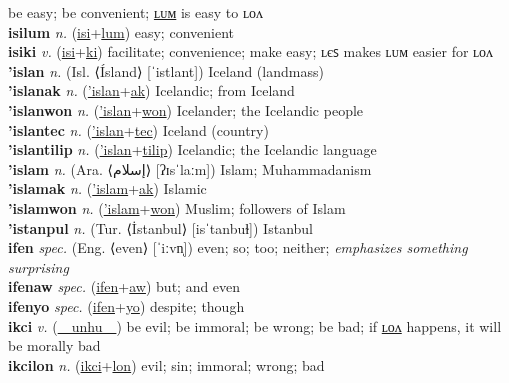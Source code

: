 be easy; be convenient; \hyperref[isilum]{ʟᴜᴍ} is easy to ʟᴏᴧ \label{isi} \\
\textbf{isilum} \textit{n.} (\hyperref[isi]{isi}+\hyperref[lum]{lum})
easy; convenient \label{isilum} \\
\textbf{isiki} \textit{v.} (\hyperref[isi]{isi}+\hyperref[ki]{ki})
facilitate; convenience; make easy; ʟєꜱ makes ʟᴜᴍ easier for ʟᴏᴧ \label{isiki} \\
\textbf{'islan} \textit{n.} (Isl. ⟨Ísland⟩ [ˈistlant])
Iceland (landmass) \label{'islan} \\
\textbf{'islanak} \textit{n.} (\hyperref['islan]{'islan}+\hyperref[ak]{ak})
Icelandic; from Iceland \label{'islanak} \\
\textbf{'islanwon} \textit{n.} (\hyperref['islan]{'islan}+\hyperref[won]{won})
Icelander; the Icelandic people \label{'islanwon} \\
\textbf{'islantec} \textit{n.} (\hyperref['islan]{'islan}+\hyperref[tec]{tec})
Iceland (country) \label{'islantec} \\
\textbf{'islantilip} \textit{n.} (\hyperref['islan]{'islan}+\hyperref[tilip]{tilip})
Icelandic; the Icelandic language \label{'islantilip} \\
\textbf{'islam} \textit{n.} (Ara. ⟨إسلام⟩ [ʔɪsˈlaːm])
Islam; Muhammadanism \label{'islam} \\
\textbf{'islamak} \textit{n.} (\hyperref['islam]{'islam}+\hyperref[ak]{ak})
Islamic \label{'islamak} \\
\textbf{'islamwon} \textit{n.} (\hyperref['islam]{'islam}+\hyperref[won]{won})
Muslim; followers of Islam \label{'islamwon} \\
\textbf{'istanpul} \textit{n.} (Tur. ⟨İstanbul⟩ [isˈtanbuɫ])
Istanbul \label{'istanpul} \\
\textbf{ifen} \textit{spec.} (Eng. ⟨even⟩ [ˈiːvn̩])
even; so; too; neither; \textit{emphasizes something surprising} \label{ifen} \\
\textbf{ifenaw} \textit{spec.} (\hyperref[ifen]{ifen}+\hyperref[aw]{aw})
but; and even \label{ifenaw} \\
\textbf{ifenyo} \textit{spec.} (\hyperref[ifen]{ifen}+\hyperref[yo]{yo})
despite; though \label{ifenyo} \\
\textbf{ikci} \textit{v.} (\hyperref[unhu]{~~unhu~~})
be evil; be immoral; be wrong; be bad; if \hyperref[ikcilon]{ʟᴏᴧ} happens, it will be morally bad \label{ikci} \\
\textbf{ikcilon} \textit{n.} (\hyperref[ikci]{ikci}+\hyperref[lon]{lon})
evil; sin; immoral; wrong; bad \label{ikcilon} \\
